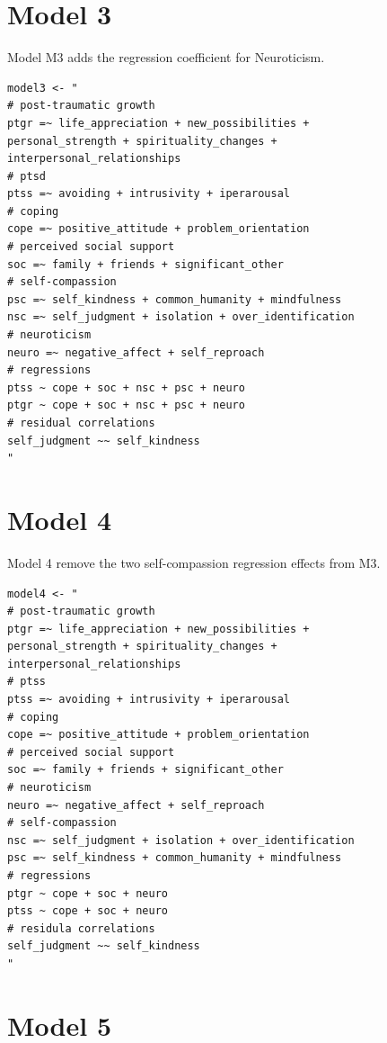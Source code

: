 \documentclass[
  english,
  man,floatsintext]{apa7}
\begin{document}
\begin{appendix}
\newpage

\hypertarget{model-3}{%
\section{Model 3}\label{model-3}}

Model M3 adds the regression coefficient for Neuroticism.

\begin{verbatim}
model3 <- "
# post-traumatic growth
ptgr =~ life_appreciation + new_possibilities + 
personal_strength + spirituality_changes + 
interpersonal_relationships
# ptsd
ptss =~ avoiding + intrusivity + iperarousal
# coping
cope =~ positive_attitude + problem_orientation 
# perceived social support
soc =~ family + friends + significant_other
# self-compassion
psc =~ self_kindness + common_humanity + mindfulness
nsc =~ self_judgment + isolation + over_identification
# neuroticism
neuro =~ negative_affect + self_reproach
# regressions
ptss ~ cope + soc + nsc + psc + neuro
ptgr ~ cope + soc + nsc + psc + neuro
# residual correlations
self_judgment ~~ self_kindness
"
\end{verbatim}

\newpage

\hypertarget{model-4}{%
\section{Model 4}\label{model-4}}

Model 4 remove the two self-compassion regression effects from M3.

\begin{verbatim}
model4 <- "
# post-traumatic growth
ptgr =~ life_appreciation + new_possibilities + 
personal_strength + spirituality_changes + 
interpersonal_relationships
# ptss
ptss =~ avoiding + intrusivity + iperarousal
# coping
cope =~ positive_attitude + problem_orientation 
# perceived social support
soc =~ family + friends + significant_other
# neuroticism
neuro =~ negative_affect + self_reproach
# self-compassion
nsc =~ self_judgment + isolation + over_identification
psc =~ self_kindness + common_humanity + mindfulness
# regressions
ptgr ~ cope + soc + neuro
ptss ~ cope + soc + neuro
# residula correlations
self_judgment ~~ self_kindness
"
\end{verbatim}

\newpage

\hypertarget{model-5}{%
\section{Model 5}\label{model-5}}


\end{appendix}
\end{document}
